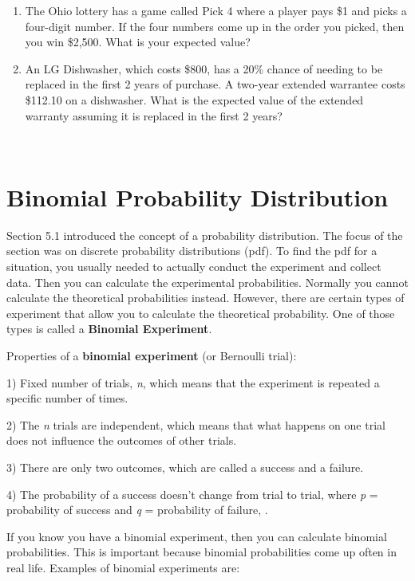 \documentclass[]{book}
\begin{document}
\begin{enumerate}
\def\labelenumi{\arabic{enumi}.}
\setcounter{enumi}{2}
\item
  The Ohio lottery has a game called Pick 4 where a player pays \$1
  and picks a four-digit number. If the four numbers come up in the
  order you picked, then you win \$2,500. What is your expected value?
\item
  An LG Dishwasher, which costs \$800, has a 20\% chance of needing to
  be replaced in the first 2 years of purchase. A two-year extended
  warrantee costs \$112.10 on a dishwasher. What is the expected value
  of the extended warranty assuming it is replaced in the first 2
  years?
\end{enumerate}

\textbf{\\
}

\hypertarget{binomial-probability-distribution}{%
\section{Binomial Probability Distribution}\label{binomial-probability-distribution}}

Section 5.1 introduced the concept of a probability distribution. The
focus of the section was on discrete probability distributions (pdf). To
find the pdf for a situation, you usually needed to actually conduct the
experiment and collect data. Then you can calculate the experimental
probabilities. Normally you cannot calculate the theoretical
probabilities instead. However, there are certain types of experiment
that allow you to calculate the theoretical probability. One of those
types is called a \textbf{Binomial Experiment}.

Properties of a \textbf{binomial experiment} (or Bernoulli trial):

1) Fixed number of trials, \emph{n}, which means that the experiment is
repeated a specific number of times.

2) The \emph{n} trials are independent, which means that what happens on one
trial does not influence the outcomes of other trials.

3) There are only two outcomes, which are called a success and a
failure.

4) The probability of a success doesn't change from trial to trial,
where \emph{p} = probability of success and \emph{q} = probability of failure, .

If you know you have a binomial experiment, then you can calculate
binomial probabilities. This is important because binomial probabilities
come up often in real life. Examples of binomial experiments are:
\end{document}
